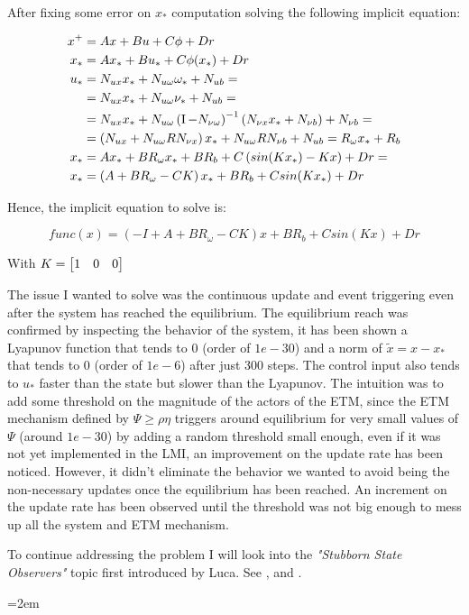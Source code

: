 \documentclass{article}
\begin{document}
After fixing some error on $x_{*}$ computation solving the following implicit equation:

\begin{align*}
  x^{+} &= A x + B u + C \phi + D r\\
  x_{*} &= A x_{*} + B u_{*} + C \phi(x_{*}) + D r \\
  u_{*} &= N_{ux} x_{*} + N_{u \omega} \omega_{*} + N_{ub} = \\
  &= N_{ux} x_{*} + N_{u \omega} \nu_{*} + N_{ub} = \\
  &= N_{ux} x_{*} + N_{u \omega} \left( \operatorname{I} - N_{\nu \omega} \right) ^{-1} \left(  N_{\nu x} x_{*} + N_{\nu b}\right) + N_{\nu b} = \\
  &= \left( N_{ux} + N_{u \omega} R N_{\nu x} \right) x_{*} + N_{u \omega} R N_{\nu b} + N_{ub} = R_{\omega} x_{*} + R_{b}\\
  x_{*} &= A x_{*} + B R_{\omega} x_{*} + B R_{b} + C \left( sin(K x_{*}) - K x \right) + D r = \\
  x_{*} &= \left( A + B R_{\omega} - C K \right) x_{*} + B R_{b} + C sin(K x_{*}) + D r
\end{align*}

Hence, the implicit equation to solve is:

\begin{equation}
  \textit{func}(x) = (-I + A + B R_{\omega} - C K) x + B R_{b} + C sin(K x) + D r 
\end{equation}

With $K = \left[\begin{matrix}1 & 0 & 0\end{matrix}\right]$
 
The issue I wanted to solve was the continuous update and event triggering even after the system has reached the equilibrium. The equilibrium reach was confirmed by inspecting the behavior of the system, it has been shown a Lyapunov function that tends to 0 (order of $1e-30$) and a norm of $\tilde{x} = x - x_{*}$ that tends to 0 (order of $1e-6$) after just 300 steps. The control input also tends to $u_{*}$ faster than the state but slower than the Lyapunov.
The intuition was to add some threshold on the magnitude of the actors of the ETM, since the ETM mechanism defined by $
  \Psi \geq \rho \eta $ triggers around equilibrium for very small values of $\Psi$ (around $1e-30$) by adding a random threshold small enough, even if it was not yet implemented in the LMI, an improvement on the update rate has been noticed. However, it didn't eliminate the behavior we wanted to avoid being the non-necessary updates once the equilibrium has been reached. An increment on the update rate has been observed until the threshold was not big enough to mess up all the system and ETM mechanism.

  To continue addressing the problem I will look into the \textit{"Stubborn State Observers"} topic first introduced by Luca. See \cite{stubborn-1}, \cite{stubborn-2} and \cite{stubborn-3}.


\pagebreak
\emergencystretch=2em %
\printbibliography
\end{document}
